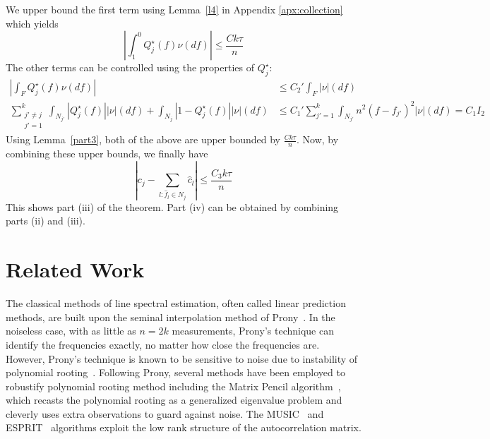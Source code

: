 We upper bound the first term using Lemma~\ref{l4} in Appendix \ref{apx:collection} which yields
\[
\left| \int^0_{1}  Q_j^\star (f) \nu(df)\right| \leq \frac{Ck \tau}{n}
\]
The other terms can be controlled using the properties of $Q_j^\star$:
\begin{align*}
\left| \int_{F}  Q_j^\star (f) \nu(df)\right| & \leq C_2' \int_{F} |\nu| (df)\\
\sum_{\substack{j' \neq j\\j'=1}}^k \int_{N_{j'}} \left| Q_j^\star (f)\right| |\nu|(df) +  \int_{N_j}  \left|1-Q_j^\star (f)\right| |\nu|(df)
& \leq
 C_1'\sum_{j'=1}^k \int_{N_{j'}} n^2 (f-f_{j'})^2 |\nu|(df) = C_1 I_2
\end{align*}
Using Lemma~\ref{part3}, both of the above are upper bounded by $\frac{C k \tau}{n}$. Now, by combining these upper bounds, we finally have
\[
\left| c_j - \sum_{l : \hat{f}_l \in N_j} \hat{c}_l \right| \leq \frac{C_3 k \tau}{n}
\]
This shows part (iii) of the theorem. Part (iv) can be obtained by combining parts (ii) and (iii).


\section{Related Work}
\label{sec:prony-method}



The classical methods of line spectral estimation, often called linear
prediction methods, are built upon the seminal interpolation method of
Prony~\cite{prony1795}. In the noiseless case, with as little as $n=2k$
measurements, Prony's technique can identify the frequencies exactly, no matter
how close the frequencies are. However, Prony's technique is known to be
sensitive to noise due to instability of polynomial rooting~\cite{kahn92}.
Following Prony, several methods have been employed to robustify polynomial
rooting method including the Matrix Pencil algorithm~\cite{hua02}, which
recasts the polynomial rooting as a generalized eigenvalue problem and cleverly
uses extra observations to guard against noise. The MUSIC~\cite{music} and
ESPRIT~\cite{esprit} algorithms exploit the low rank structure of the
autocorrelation matrix.


